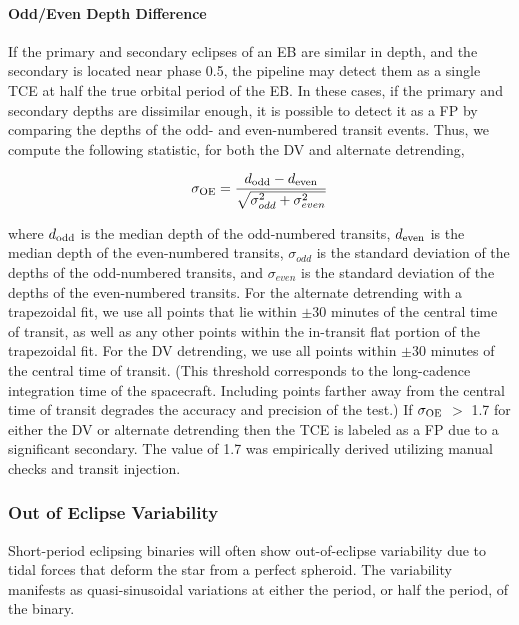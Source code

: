 \paragraph{Odd/Even Depth Difference}

If the primary and secondary eclipses of an EB are similar in depth, and the secondary is located near phase 0.5, the \kepler{} pipeline may detect them as a single TCE at half the true orbital period of the EB. In these cases, if the primary and secondary depths are dissimilar enough, it is possible to detect it as a FP by comparing the depths of the odd- and even-numbered transit events. Thus, we compute the following statistic, for both the DV and alternate detrending,

\begin{equation}
\sigma_{\rm OE} = \frac{d_{\rm odd} - d_{\rm even}}{\sqrt{\sigma_{odd}^{2} + \sigma_{even}^{2}}} 
\end{equation}

\noindent where $d_{\rm odd}$ is the median depth of the odd-numbered transits, $d_{\rm even}$ is the median depth of the even-numbered transits, $\sigma_{odd}$ is the standard deviation of the depths of the odd-numbered transits, and $\sigma_{even}$ is the standard deviation of the depths of the even-numbered transits. For the alternate detrending with a trapezoidal fit, we use all points that lie within $\pm$30 minutes of the central time of transit, as well as any other points within the in-transit flat portion of the trapezoidal fit. For the DV detrending, we use all points within $\pm$30 minutes of the central time of transit. (This threshold corresponds to the long-cadence integration time of the \kepler{} spacecraft. Including points farther away from the central time of transit degrades the accuracy and precision of the test.) If $\sigma_{\rm OE}$ $>$ 1.7 for either the DV or alternate detrending then the TCE is labeled as a FP due to a significant secondary. The value of 1.7 was empirically derived utilizing manual checks and transit injection.


\subsubsection{Out of Eclipse Variability}

Short-period eclipsing binaries will often show out-of-eclipse variability due to tidal forces that deform the star from a perfect spheroid. The variability manifests as quasi-sinusoidal variations at either the period, or half the period, of the binary.

